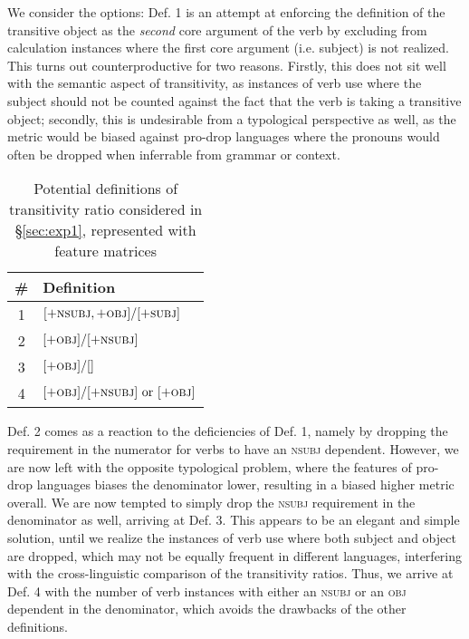 We consider the options: Def. 1 is an attempt at enforcing the definition of the transitive object as the \textit{second} core argument of the verb by excluding from calculation instances where the first core argument (i.e. subject) is not realized. This turns out counterproductive for two reasons. Firstly, this does not sit well with the semantic aspect of transitivity, as instances of verb use where the subject should not be counted against the fact that the verb is taking a transitive object; secondly, this is undesirable from a typological perspective as well, as the metric would be biased against pro-drop languages where the pronouns would often be dropped when inferrable from grammar or context. 

\begin{table}[ht]
  \label{tab:transitivity-defs}
  \centering
  \begin{tabularx}{0.5\textwidth}{cX}
  {\#} & \textbf{Definition} \\
  \hline
  1&$[+\textsc{nsubj}, +\textsc{obj}]/ [+\textsc{subj}]$ \\
  2&$[+\textsc{obj}] / [+\textsc{nsubj}]$  \\
  3&$[+\textsc{obj}] / []$ \\
  4&$[+\textsc{obj}] / [+\textsc{nsubj}] \text{ or } [+\textsc{obj}]$
  \end{tabularx}
  \caption{Potential definitions of transitivity ratio considered in §\ref{sec:exp1}, represented with feature matrices}
\end{table}

Def. 2 comes as a reaction to the deficiencies of Def. 1, namely by dropping the requirement in the numerator for verbs to have an \textsc{nsubj} dependent. However, we are now left with the opposite typological problem, where the features of pro-drop languages biases the denominator lower, resulting in a biased higher metric overall. We are now tempted to simply drop the \textsc{nsubj} requirement in the denominator as well, arriving at Def. 3. This appears to be an elegant and simple solution, until we realize the instances of verb use where both subject and object are dropped, which may not be equally frequent in different languages, interfering with the cross-linguistic comparison of the transitivity ratios. Thus, we arrive at Def. 4 with the number of verb instances with either an \textsc{nsubj} or an \textsc{obj} dependent in the denominator, which avoids the drawbacks of the other definitions. 

